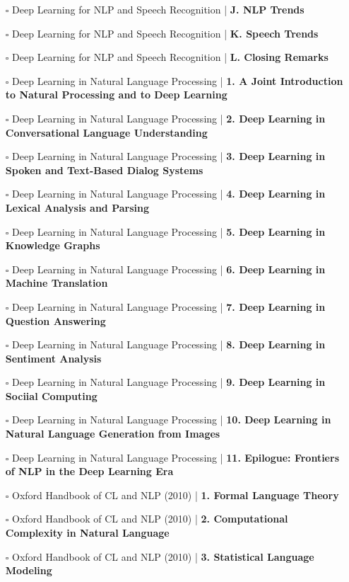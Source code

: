 \documentclass[a4, landscape, 12pt]{article}
\newcommand{\checkbox}{$\square$}%
\begin{document}
\begin{itemize}
{}
\item [\checkbox]  Deep Learning for NLP and Speech Recognition | \textbf{ J. NLP Trends
}
\item [\checkbox]  Deep Learning for NLP and Speech Recognition | \textbf{ K. Speech Trends
}
\item [\checkbox]  Deep Learning for NLP and Speech Recognition | \textbf{ L. Closing Remarks
}
\item [\checkbox]  Deep Learning in Natural Language Processing | \textbf{ 1. A Joint Introduction to Natural Processing and to Deep Learning
}
\item [\checkbox]  Deep Learning in Natural Language Processing | \textbf{ 2. Deep Learning in Conversational Language Understanding
}
\item [\checkbox]  Deep Learning in Natural Language Processing | \textbf{ 3. Deep Learning in Spoken and Text-Based Dialog Systems
}
\item [\checkbox]  Deep Learning in Natural Language Processing | \textbf{ 4. Deep Learning in Lexical Analysis and Parsing
}
\item [\checkbox]  Deep Learning in Natural Language Processing | \textbf{ 5. Deep Learning in Knowledge Graphs
}
\item [\checkbox]  Deep Learning in Natural Language Processing | \textbf{ 6. Deep Learning in Machine Translation
}
\item [\checkbox]  Deep Learning in Natural Language Processing | \textbf{ 7. Deep Learning in Question Answering
}
\item [\checkbox]  Deep Learning in Natural Language Processing | \textbf{ 8. Deep Learning in Sentiment Analysis
}
\item [\checkbox]  Deep Learning in Natural Language Processing | \textbf{ 9. Deep Learning in Sociial Computing
}
\item [\checkbox]  Deep Learning in Natural Language Processing | \textbf{ 10. Deep Learning in Natural Language Generation from Images
}
\item [\checkbox]  Deep Learning in Natural Language Processing | \textbf{ 11. Epilogue: Frontiers of NLP in the Deep Learning Era
}
\item [\checkbox]  Oxford Handbook of CL and NLP (2010) | \textbf{ 1. Formal Language Theory
}
\item [\checkbox]  Oxford Handbook of CL and NLP (2010) | \textbf{ 2. Computational Complexity in Natural Language
}
\item [\checkbox]  Oxford Handbook of CL and NLP (2010) | \textbf{ 3. Statistical Language Modeling
}
\end{itemize}
\end{document}
